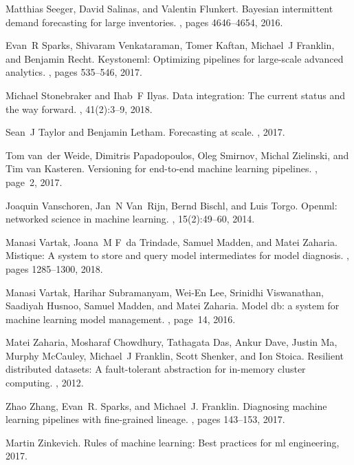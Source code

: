 \documentclass[11pt]{article}
\begin{document}
\begin{thebibliography}{10}
Matthias Seeger, David Salinas, and Valentin Flunkert.
\newblock Bayesian intermittent demand forecasting for large inventories.
, pages 4646--4654, 2016.

Evan~R Sparks, Shivaram Venkataraman, Tomer Kaftan, Michael~J Franklin, and
  Benjamin Recht.
\newblock Keystoneml: Optimizing pipelines for large-scale advanced analytics.
, pages 535--546, 2017.

Michael Stonebraker and Ihab~F Ilyas.
\newblock Data integration: The current status and the way forward.
, 41(2):3--9, 2018.

Sean~J Taylor and Benjamin Letham.
\newblock Forecasting at scale.
, 2017.

Tom van~der Weide, Dimitris Papadopoulos, Oleg Smirnov, Michal Zielinski, and
  Tim van Kasteren.
\newblock Versioning for end-to-end machine learning pipelines.
, page~2, 2017.

Joaquin Vanschoren, Jan~N Van~Rijn, Bernd Bischl, and Luis Torgo.
\newblock Openml: networked science in machine learning.
, 15(2):49--60, 2014.

Manasi Vartak, Joana~M F~da Trindade, Samuel Madden, and Matei Zaharia.
\newblock Mistique: A system to store and query model intermediates for model
  diagnosis.
, pages 1285--1300, 2018.

Manasi Vartak, Harihar Subramanyam, Wei-En Lee, Srinidhi Viswanathan, Saadiyah
  Husnoo, Samuel Madden, and Matei Zaharia.
\newblock Model db: a system for machine learning model management.
, page~14,
  2016.

Matei Zaharia, Mosharaf Chowdhury, Tathagata Das, Ankur Dave, Justin Ma, Murphy
  McCauley, Michael~J Franklin, Scott Shenker, and Ion Stoica.
\newblock Resilient distributed datasets: A fault-tolerant abstraction for
  in-memory cluster computing.
, 2012.

Zhao Zhang, Evan~R. Sparks, and Michael~J. Franklin.
\newblock Diagnosing machine learning pipelines with fine-grained lineage.
, pages 143--153, 2017.

Martin Zinkevich.
\newblock Rules of machine learning: Best practices for ml engineering, 2017.
\end{thebibliography}
\end{document}
